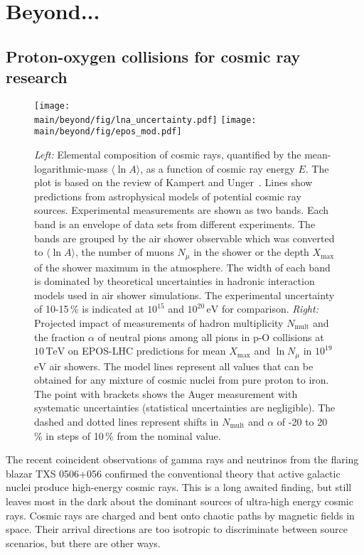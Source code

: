 \documentclass[../report.tex]{subfiles}
\providecommand{\main}{..}
\newcommand{\mlna}{\langle \ln\!A \rangle}
\newcommand{\nmu}{N_\mu}
\newcommand{\lnnmu}{\ln\!\nmu}
\newcommand{\xmax}{X_\text{max}}
\newcommand{\nmult}{N_\text{mult}}
\newcommand{\si}[1]{\ensuremath{\text{#1}}}
\newcommand{\SI}[2]{\ensuremath{#1\,\si{#2}}}
\begin{document}
\section{Beyond...}

\subsection{Proton-oxygen collisions for cosmic ray research}
\label{sec:pOcosmic}

\begin{figure}
\texttt{[image: \\main/beyond/fig/lna\_uncertainty.pdf]}
\texttt{[image: \\main/beyond/fig/epos\_mod.pdf]}
\caption{\emph{Left:} Elemental composition of cosmic rays, quantified by the mean-logarithmic-mass $\mlna$, as a function of cosmic ray energy $E$. The plot is based on the review of Kampert and Unger~\cite{kampert_cr_review}. Lines show predictions from astrophysical models of potential cosmic ray sources. Experimental measurements are shown as two bands. Each band is an envelope of data sets from different experiments. The bands are grouped by the air shower observable which was converted to $\mlna$, the number of muons $\nmu$ in the shower or the depth $\xmax$ of the shower maximum in the atmosphere. The width of each band is dominated by theoretical uncertainties in hadronic interaction models used in air shower simulations. The experimental uncertainty of 10-15\,\% is indicated at $10^{15}$ and $10^{20}$\,\si{eV} for comparison. \emph{Right:} Projected impact of measurements of hadron multiplicity $\nmult$ and the fraction $\alpha$ of neutral pions among all pions in p-O collisions at \SI{10}{TeV} on EPOS-LHC predictions for mean $\xmax$ and $\lnnmu$ in $10^{19}$\,\si{eV} air showers. The model lines represent all values that can be obtained for any mixture of cosmic nuclei from pure proton to iron. The point with brackets shows the Auger measurement with systematic uncertainties (statistical uncertainties are negligible). The dashed and dotted lines represent shifts in $\nmult$ and $\alpha$ of -20 to 20\,\% in steps of 10\,\% from the nominal value.}
\label{fig:cosmic_rays}
\end{figure}

The recent coincident observations of gamma rays and neutrinos from the flaring blazar TXS 0506+056 confirmed the conventional theory that active galactic nuclei produce high-energy cosmic rays\cite{IceCube:2018dnn}. This is a long awaited finding, but still leaves most in the dark about the dominant sources of ultra-high energy cosmic rays. Cosmic rays are charged and bent onto chaotic paths by magnetic fields in space. Their arrival directions are too isotropic to discriminate between source scenarios, but there are other ways.
\end{document}
